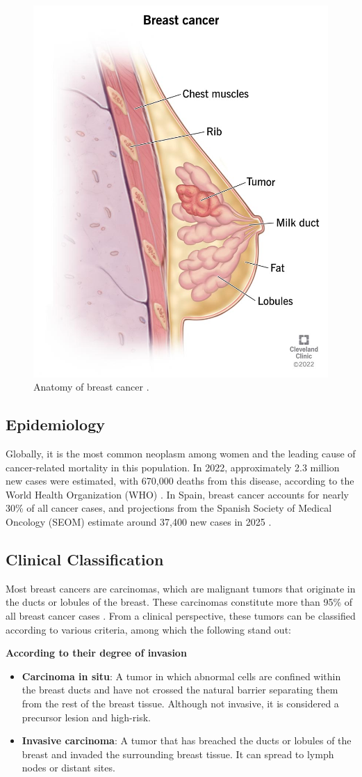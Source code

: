 \documentclass[a4paper,10pt]{book}
\begin{document}
\begin{figure}[h]
	\centering
	\includegraphics[width=0.3\linewidth]{reports//assets/bc.jpg}
	\caption{Anatomy of breast cancer \cite{cleveland_clinic_breast_2023}.}
	\label{fig:breast-cancer-anatomy}
\end{figure}

\subsection{Epidemiology}

Globally, it is the most common neoplasm among women and the leading cause of cancer-related mortality in this population. In 2022, approximately 2.3 million new cases were estimated, with 670,000 deaths from this disease, according to the World Health Organization (WHO) \cite{who_breast_2024}. In Spain, breast cancer accounts for nearly 30\% of all cancer cases, and projections from the Spanish Society of Medical Oncology (SEOM) estimate around 37,400 new cases in 2025 \cite{seom_cancer_nodate}.

\subsection{Clinical Classification}

Most breast cancers are carcinomas, which are malignant tumors that originate in the ducts or lobules of the breast. These carcinomas constitute more than 95\% of all breast cancer cases \cite{makki_diversity_2015, noauthor_types_nodate}. From a clinical perspective, these tumors can be classified according to various criteria, among which the following stand out:

\textbf{According to their degree of invasion}
\begin{itemize}
	\item \textbf{Carcinoma in situ}: A tumor in which abnormal cells are confined within the breast ducts and have not crossed the natural barrier separating them from the rest of the breast tissue. Although not invasive, it is considered a precursor lesion and high-risk.
	\item \textbf{Invasive carcinoma}: A tumor that has breached the ducts or lobules of the breast and invaded the surrounding breast tissue. It can spread to lymph nodes or distant sites. 
\end{itemize}
\end{document}
